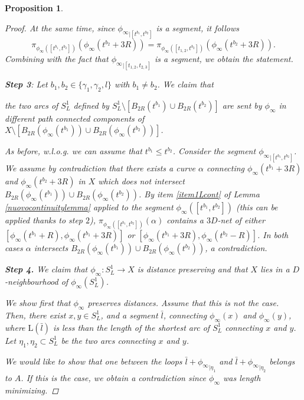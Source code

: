 \documentclass[10pt]{article}
\newtheorem{proposition}[thm]{Proposition}
\theoremstyle{definition}
\newcommand{\length}{\mathrm{L}}
\begin{document}
\begin{proposition}
\begin{proof}
        At the same time, since ${\phi_\infty}_{|[t^{b_1},t^{b_2}]}$ is a segment, it follows 
        \[
        \pi_{\phi_\infty([t^{b_1},t^{b_2}])}(\phi_\infty(t^{b_2}+3R))=
        \pi_{\phi_\infty([t_{1,2},t^{b_2}])}(\phi_\infty(t^{b_2}+3R)).
        \]
        Combining with the fact that ${\phi_\infty}_{|[t_{1,2},t_{2,3}]}$ is a segment, we obtain the statement.
        
        \textbf{Step 3}: Let $b_1,b_2 \in \{\gamma_1,\gamma_2,l\}$ with $b_1 \neq b_2$. We claim that 
        
        the two arcs of $S^1_L$ defined by
        $S^1_L \setminus [B_{2R}(t^{b_1}) \cup B_{2R}(t^{b_2})]$ are sent by $\phi_\infty$ in different path connected components of $X \setminus [B_{2R}(\phi_\infty(t^{b_1})) \cup B_{2R}(\phi_\infty(t^{b_2}))]$.

        As before, w.l.o.g. we can assume that $t^{b_1} \leq t^{b_2}$. Consider the segment ${\phi_\infty}_{|[t^{b_1},t^{b_2}]}$. We assume by contradiction that there exists a curve $\alpha$ connecting $\phi_\infty(t^{b_1}+3R)$ and $\phi_\infty(t^{b_2}+3R)$ in $X$ which does not intersect $B_{2R}(\phi_\infty(t^{b_1})) \cup B_{2R}(\phi_\infty(t^{b_2}))$. By item \ref{item1Lcont} of Lemma \ref{nuovocontinuitylemma} applied to the segment $\phi_\infty([t^{b_1},t^{b_2}])$ (this can be applied thanks to step $2$), $\pi_{\phi_\infty([t^{b_1},t^{b_2}])}(\alpha)$ contains a $3D$-net of either $[\phi_\infty(t^{b_1}+R),\phi_\infty(t^{b_1}+3R)]$ or $[\phi_\infty(t^{b_1}+3R),\phi_\infty(t^{b_2}-R)]$. In both cases $\alpha$ intersects  $B_{2R}(\phi_\infty(t^{b_1})) \cup B_{2R}(\phi_\infty(t^{b_2}))$, a contradiction.

         \textbf{Step 4.} We claim that $\phi_\infty:S^1_L \to X$ is distance preserving and that $X$ lies in a $D$-neighbourhood of $\phi_\infty(S^1_L)$.

         We show first that $\phi_\infty$ preserves distances. Assume that this is not the case. Then, there exist $x,y \in S^1_L$, and a segment $\bar{l}$, connecting $\phi_\infty(x)$ and $\phi_\infty(y)$, where $\length(\bar{l})$ is less than the length of the shortest arc of $S^1_L$ connecting $x$ and $y$. Let $\eta_1,\eta_2 \subset S^1_L$ be the two arcs connecting $x$ and $y$.
        
        We would like to show that one between the loops $\bar{l}+{\phi_\infty}_{|\eta_1}$ and $\bar{l}+{\phi_\infty}_{|\eta_2}$ belongs to $A$. If this is the case, we obtain a contradiction since $\phi_\infty$ was length minimizing.


\end{proof}
\end{proposition}
\end{document}

